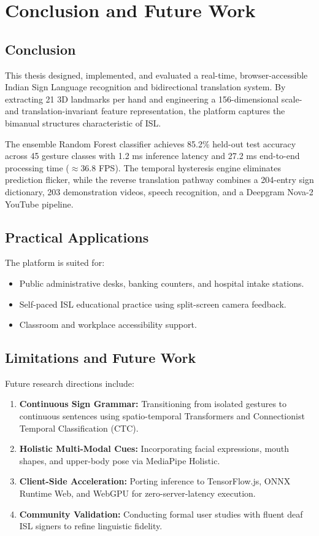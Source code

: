 
\chapter{Conclusion and Future Work}
\label{Chapter6}

\section{Conclusion}
This thesis designed, implemented, and evaluated a real-time, browser-accessible Indian Sign Language recognition and bidirectional translation system. By extracting 21 3D landmarks per hand and engineering a 156-dimensional scale- and translation-invariant feature representation, the platform captures the bimanual structures characteristic of ISL.

The ensemble Random Forest classifier achieves 85.2\% held-out test accuracy across 45 gesture classes with 1.2 ms inference latency and 27.2 ms end-to-end processing time ($\approx 36.8$ FPS). The temporal hysteresis engine eliminates prediction flicker, while the reverse translation pathway combines a 204-entry sign dictionary, 203 demonstration videos, speech recognition, and a Deepgram Nova-2 YouTube pipeline.

\section{Practical Applications}
The platform is suited for:
\begin{itemize}
\item Public administrative desks, banking counters, and hospital intake stations.
\item Self-paced ISL educational practice using split-screen camera feedback.
\item Classroom and workplace accessibility support.
\end{itemize}

\section{Limitations and Future Work}
Future research directions include:
\begin{enumerate}
\item \textbf{Continuous Sign Grammar:} Transitioning from isolated gestures to continuous sentences using spatio-temporal Transformers and Connectionist Temporal Classification (CTC).
\item \textbf{Holistic Multi-Modal Cues:} Incorporating facial expressions, mouth shapes, and upper-body pose via MediaPipe Holistic.
\item \textbf{Client-Side Acceleration:} Porting inference to TensorFlow.js, ONNX Runtime Web, and WebGPU for zero-server-latency execution.
\item \textbf{Community Validation:} Conducting formal user studies with fluent deaf ISL signers to refine linguistic fidelity.
\end{enumerate}
